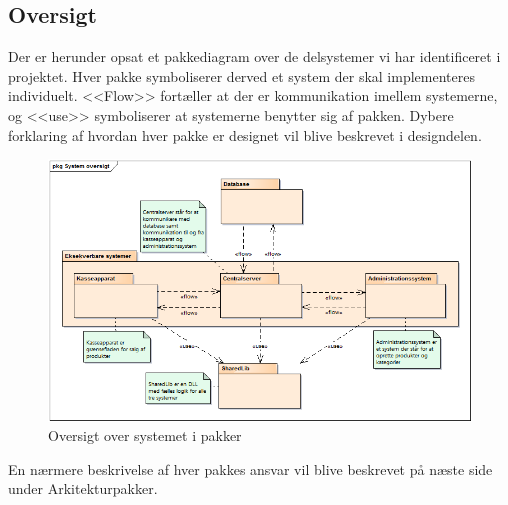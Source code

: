 \subsection{Oversigt}\label{logical:oversigt}

Der er herunder opsat et pakkediagram over de delsystemer vi har identificeret i projektet. Hver pakke symboliserer derved et system der skal implementeres individuelt. <<Flow>> fortæller at der er kommunikation imellem systemerne, og <<use>> symboliserer at systemerne benytter sig af pakken. Dybere forklaring af hvordan hver pakke er designet vil blive beskrevet i designdelen.

\begin{figure}[ht]
	\centering
    \includegraphics[scale=1]{Systemarkitektur/LogiskView/systemoversigt}
    \caption{Oversigt over systemet i pakker}
    \label{fig:system_oversigt}
\end{figure}

En nærmere beskrivelse af hver pakkes ansvar vil blive beskrevet på næste side under Arkitekturpakker.

\newpage

